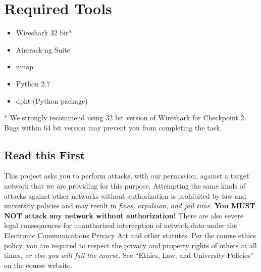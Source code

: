 \documentclass[letterpaper,12pt]{report}
\begin{document}
\section*{Required Tools}
\begin{itemize}
\item Wireshark 32 bit*
\item Aircrack-ng Suite
\item nmap
\item Python 2.7
\item dpkt (Python package)
\end{itemize}
* We strongly recommend using 32 bit version of Wireshark for Checkpoint 2.
Bugs within 64 bit version may prevent you from completing the task.

\newpage

\subsection*{Read this First}

This project asks you to perform attacks, with our permission, against a target network that we are providing for this purpose.
Attempting the same kinds of attacks against other networks without authorization is prohibited by law and university policies and may result in \emph{fines, expulsion, and jail time}.
\textbf{You MUST NOT attack any network without authorization!}
There are also severe legal consequences for unauthorized interception of network data under the Electronic Communications Privacy Act and other statutes.
Per the course ethics policy, you are required to respect the privacy and property rights of others at all times, \emph{or else you will fail the course.}
See ``Ethics, Law, and University Policies'' on the course website.

\newpage

\setcounter{chapter}{4}



\newpage


\end{document}
